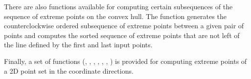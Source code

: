 There are also functions available for computing certain subsequences 
of the sequence of extreme points on the convex hull.  The function
generates the counterclockwise ordered subsequence of
extreme points between a given pair of points and
computes the sorted sequence of extreme points that are
not left of the line defined by the first and last input points.

Finally, a set of functions 
(, , , ,
, , )
is provided for computing extreme points of a 
2D point set in the coordinate directions.%
